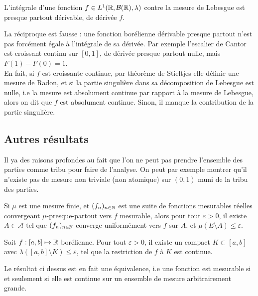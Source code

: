 \documentclass[11pt,a4paper]{article}
\begin{document}
\begin{corstar}
L'intégrale d'une fonction $f \in L^1(\mathbb R,\mathcal{B}(\mathbb R),\lambda)$ contre la mesure de Lebesgue est presque partout dérivable, de dérivée $f$.
\end{corstar}

\begin{rmq}
La réciproque est fausse : une fonction borélienne dérivable presque partout n'est pas forcément égale à l'intégrale de sa dérivée. Par exemple l'escalier de Cantor est croissant continu sur $[0,1]$, de dérivée presque partout nulle, mais $F(1)-F(0)=1$. \\
En fait, si $f$ est croissante continue, par théorème de Stieltjes elle définie une mesure de Radon, et si la partie singulière dans sa décomposition de Lebesgue est nulle, i.e la mesure est absolument continue par rapport à la mesure de Lebesgue, alors on dit que $f$ est absolument continue. Sinon, il manque la contribution de la partie singulière.
\end{rmq}


\subsection*{Autres résultats}

\begin{rmq}
Il ya des raisons profondes au fait que l'on ne peut pas prendre l'ensemble des parties comme tribu pour faire de l'analyse. On peut par exemple montrer qu'il n'existe pas de mesure non triviale (non atomique) sur $(0,1)$ muni de la tribu des parties.
\end{rmq}

\begin{thmstar}
[Egorov] Si $\mu$ est une mesure finie, et $(f_n)_{n\in \mathbb N}$ est une suite de fonctions mesurables réelles convergeant $\mu$-presque-partout vers $f$ mesurable, alors pour tout $\varepsilon > 0$, il existe $A\in \mathcal{A}$ tel que $(f_n)_{n\in \mathbb N}$ converge uniformément vers $f$ sur $A$, et $\mu(E\setminus A) \leq \varepsilon $. 
\end{thmstar}

\begin{thmstar}
[Lusin] Soit $f : [a,b] \mapsto \mathbb R$ borélienne. Pour tout $\varepsilon>0$, il existe un compact $K\subset [a,b]$ avec $\lambda([a,b]\setminus K) \leq \varepsilon$, tel que la restriction de $f$ à $K$ est continue.
\end{thmstar}

\begin{rmq}
Le résultat ci dessus est en fait une équivalence, i.e une fonction est mesurable si et seulement si elle est continue sur un ensemble de mesure arbitrairement grande.
\end{rmq}
\end{document}
